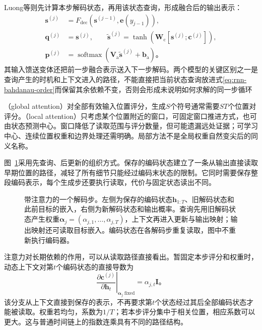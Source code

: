Luong等则先计算本步解码状态，再用该状态查询，形成融合后的输出表示：
\begin{equation}
  \begin{aligned}
    \bm{s}^{(j)}&=F_{\mathrm{dec}}\!\left(
      \bm{s}^{(j-1)},\bm{e}(y_{j-1})\right),\\
    \bm{q}^{(j)}&=\bm{s}^{(j)},\qquad
    \widetilde{\bm{s}}^{(j)}=
       \tanh\!\left(\bm{W}_{\mathrm{c}}[\bm{s}^{(j)};\bm{c}^{(j)}]\right),\\
    \bm{p}^{(j)}&=\operatorname{softmax}\!\left(
      \bm{V}_{\mathrm{a}}\widetilde{\bm{s}}^{(j)}+\bm{b}_{\mathrm{a}}\right)\text{。}
  \end{aligned}
  \label{eq:rnn-luong-order}
\end{equation}
其输入馈送变体还把前一步融合表示送入下一步解码。两个模型的关键区别之一是查询产生的时机和上下文进入的路径，不能直接把当前状态查询放进式\eqref{eq:rnn-bahdanau-order}而保留其余依赖不变，否则会形成未说明如何求解的同一步循环

（global attention）对全部有效输入位置评分，生成$S$个符号通常需要$ST$个位置对评分。（local attention）只考虑某个位置附近的窗口，可固定窗口推进方式，也可由状态预测中心。窗口降低了读取范围与评分数量，但可能遗漏远处证据；可学习中心、连续位置权重和边界处理还需明确。局部方法不是全局权重自然变尖后的同义名称。

图~\ref{fig:rnn-attention-paths}采用先查询、后更新的组织方式。保存的编码状态建立了一条从输出直接读取早期位置的路径，减轻了所有细节只能经过编码末状态的限制。它同时需要保存整段编码表示，每个生成步还要执行读取，代价与固定状态读出不同。

\begin{figure}[htb]
  \centering
  
  \caption{带注意力的一个解码步。左侧为保存的编码状态$\bm h_{1:T}$、旧解码状态和此前目标的嵌入，右侧为新解码状态和输出概率。查询先用旧解码状态产生权重$\bm\alpha_j=(\alpha_{j,1},\ldots,\alpha_{j,T})$，上下文再进入更新与输出映射；输出映射还可读取目标嵌入。编码状态在各解码步重复读取，图中不重新执行编码器。}
  \label{fig:rnn-attention-paths}
\end{figure}


注意力对长期依赖的作用，可以从读取路径直接看出。暂固定本步评分和权重时，动态上下文对第$t$个编码状态的直接导数为
\begin{equation}
  \left.\frac{\partial\bm c^{(j)}}{\partial\bm h_t}\right|_{\bm\alpha_j\ \mathrm{fixed}}
       =\alpha_{j,t}\bm I\text{。}
  \label{eq:rnn-attention-direct-path}
\end{equation}
该分支从上下文直接到保存的表示，不再要求第$t$个状态经过其后全部编码状态才能被读取。权重若均匀，系数为$1/T$；若本步评分集中于相关位置，相应系数可以更大。这与普通时间链上的指数连乘具有不同的路径结构。

